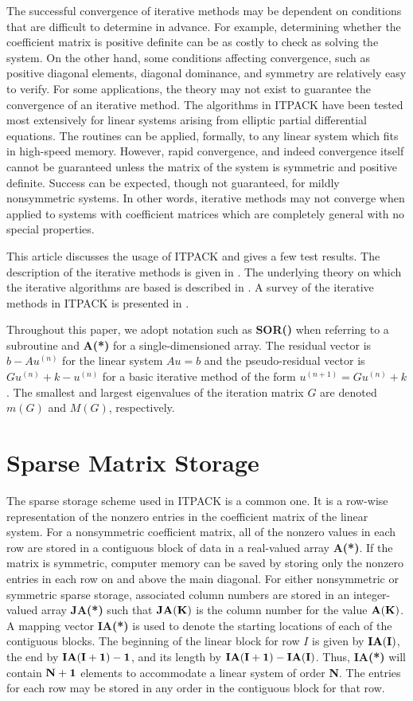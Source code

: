 The successful convergence of iterative methods may be dependent on
conditions that are difficult to determine in advance.  For example,
determining whether the coefficient matrix is positive definite can be
as costly to check as solving the system.  On the other hand, some
conditions affecting convergence, such as positive diagonal elements,
diagonal dominance, and symmetry are relatively easy to verify.  For
some applications, the theory may not exist to guarantee the convergence
of an iterative method.  The algorithms in ITPACK have been tested most
extensively for linear systems arising from elliptic partial
differential equations.  The routines can be applied, formally, to any
linear system which fits in high-speed memory.  However, rapid
convergence, and indeed convergence itself cannot be guaranteed unless
the matrix of the system is symmetric and positive definite.  Success
can be expected, though not guaranteed, for mildly nonsymmetric systems.
In other words, iterative methods may not converge when applied to
systems with coefficient matrices which are completely general with no
special properties.
 
This article discusses the usage of ITPACK and gives a few test
results.  The description of the iterative methods is given in \cite{4}.
The underlying theory on which the iterative algorithms are based is
described in \cite{6}.  A survey of the iterative methods in ITPACK
is presented in \cite{11}. 
 
Throughout this paper, we adopt notation such as {\bf SOR()} when 
referring to a subroutine and {\bf A(*)} for a single-dimensioned array.
The residual vector is $b-Au^{(n)}$ for the linear system $Au=b$ and the 
pseudo-residual vector is $Gu^{(n)}+k-u^{(n)}$ for a basic iterative
method of the form $u^{(n+1)}=Gu^{(n)}+k$.  The smallest and 
largest eigenvalues of the iteration matrix $G$ are denoted $m(G)$ and 
$M(G)$, respectively.

\section{Sparse Matrix Storage}
\label{storage}
 
The sparse storage scheme used in ITPACK is a common one.  It is a
row-wise representation of the nonzero entries in the coefficient matrix
of the linear system.  For a nonsymmetric coefficient matrix, all of the
nonzero values in each row are stored in a contiguous block of data in a
real-valued array {\bf A(*)}.  If the matrix is symmetric, computer 
memory can be saved by storing only the nonzero entries in each row on 
and above the main diagonal.  For either nonsymmetric or symmetric sparse 
storage, associated column numbers are stored in an integer-valued 
array {\bf JA(*)} such that ${\bf JA(K)}$ is the column number for the 
value ${\bf A(K)}$.  A mapping vector {\bf IA(*)} is used to denote the 
starting locations of each of the contiguous blocks.  The beginning of 
the linear block for row $I$ is given by ${\bf IA(I)}$, the end by 
${\bf IA(I+1)-1}$, and its length by ${\bf IA(I+1)-IA(I)}$.  Thus,
{\bf IA(*)} will contain ${\bf N+1}$ elements to accommodate a linear 
system of order {\bf N}. The entries for each row may be stored in any 
order in the contiguous block for that row.
 
